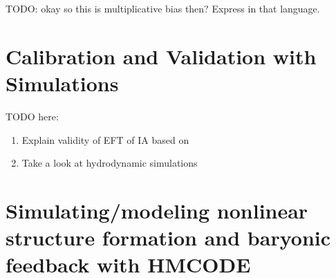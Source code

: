 \documentclass[11pt]{book}
\begin{document}
TODO: okay so this is multiplicative bias then? Express in that language.

\chapter{Calibration and Validation with Simulations}
TODO here:
\begin{enumerate}
    \item Explain validity of EFT of IA based on \cite{bakx2023effectivefieldtheoryintrinsic}
    \item Take a look at hydrodynamic simulations \cite{Samuroff_2021, Johnston_2023}
\end{enumerate}


\printbibliography

\appendix

\chapter{Simulating/modeling nonlinear structure formation and baryonic feedback with HMCODE}
\end{document}

